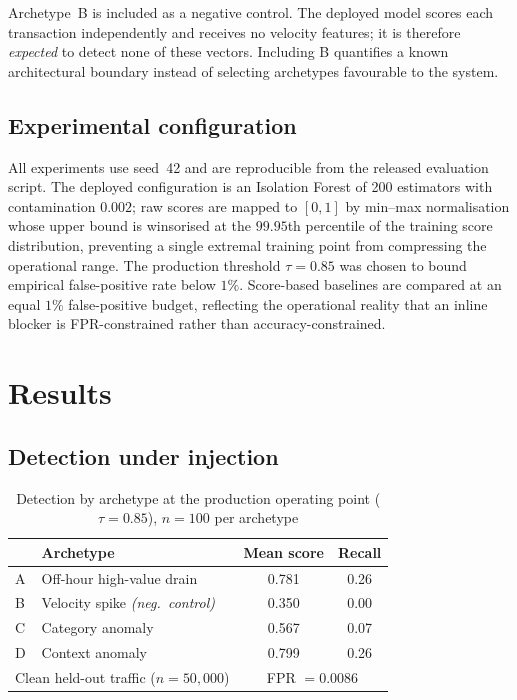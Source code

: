 \documentclass[conference]{IEEEtran}
\begin{document}
Archetype~B is included as a negative control. The deployed model scores each
transaction independently and receives no velocity features; it is therefore
\emph{expected} to detect none of these vectors. Including B quantifies a
known architectural boundary instead of selecting archetypes favourable to
the system.

\subsection{Experimental configuration}

All experiments use seed~42 and are reproducible from the released
evaluation script. The deployed configuration is an Isolation Forest of 200
estimators with contamination $0.002$; raw scores are mapped to $[0,1]$ by
min--max normalisation whose upper bound is winsorised at the $99.95$th
percentile of the training score distribution, preventing a single extremal
training point from compressing the operational range. The production
threshold $\tau = 0.85$ was chosen to bound empirical false-positive rate
below $1\%$. Score-based baselines are compared at an equal $1\%$
false-positive budget, reflecting the operational reality that an inline
blocker is FPR-constrained rather than accuracy-constrained.

\section{Results}
\label{sec:results}

\subsection{Detection under injection}

\begin{table}[t]
\caption{Detection by archetype at the production operating point
($\tau=0.85$), $n=100$ per archetype}
\label{tab:arch}
\centering
\begin{tabular}{llcc}
\toprule
& \textbf{Archetype} & \textbf{Mean score} & \textbf{Recall} \\
\midrule
A & Off-hour high-value drain & 0.781 & 0.26 \\
B & Velocity spike \emph{(neg.\ control)} & 0.350 & 0.00 \\
C & Category anomaly & 0.567 & 0.07 \\
D & Context anomaly & 0.799 & 0.26 \\
\midrule
\multicolumn{2}{l}{Clean held-out traffic ($n=50{,}000$)} &
\multicolumn{2}{c}{FPR $=0.0086$} \\
\bottomrule
\end{tabular}
\end{table}
\end{document}
